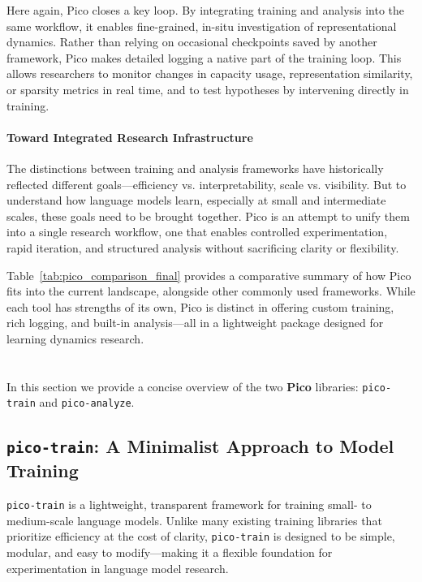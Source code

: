 Here again, Pico closes a key loop. By integrating training and analysis into the same workflow, it enables fine-grained, in-situ investigation of representational dynamics. Rather than relying on occasional checkpoints saved by another framework, Pico makes detailed logging a native part of the training loop. This allows researchers to monitor changes in capacity usage, representation similarity, or sparsity metrics in real time, and to test hypotheses by intervening directly in training.

\paragraph{Toward Integrated Research Infrastructure}
The distinctions between training and analysis frameworks have historically reflected different goals—efficiency vs. interpretability, scale vs. visibility. But to understand how language models learn, especially at small and intermediate scales, these goals need to be brought together. Pico is an attempt to unify them into a single research workflow, one that enables controlled experimentation, rapid iteration, and structured analysis without sacrificing clarity or flexibility.

Table~\ref{tab:pico_comparison_final} provides a comparative summary of how Pico fits into the current landscape, alongside other commonly used frameworks. While each tool has strengths of its own, Pico is distinct in offering custom training, rich logging, and built-in analysis—all in a lightweight package designed for learning dynamics research.

\section{\picolarge}

In this section we provide a concise overview of the two \textbf{Pico} libraries: \texttt{pico-train} and \texttt{pico-analyze}. 

\subsection{\texttt{pico-train}: A Minimalist Approach to Model Training}

\texttt{pico-train} is a lightweight, transparent framework for training small- to medium-scale language models. Unlike many existing training libraries that prioritize efficiency at the cost of clarity, \texttt{pico-train} is designed to be simple, modular, and easy to modify—making it a flexible foundation for experimentation in language model research.

